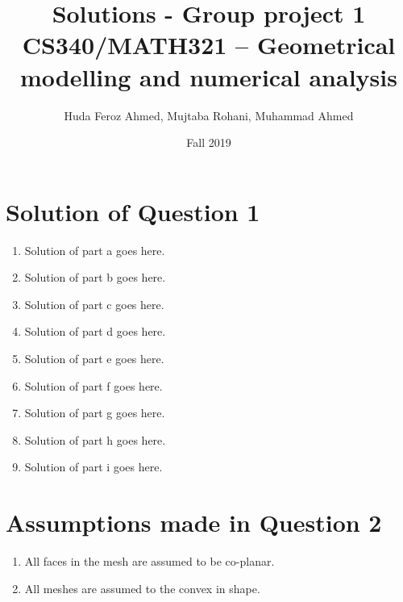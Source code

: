 \documentclass[a4paper, 11pt]{article}
\title{Solutions - Group project 1\\CS340/MATH321 -- Geometrical modelling and numerical analysis}
\date{Fall 2019}
\author{Huda Feroz Ahmed, Mujtaba Rohani, Muhammad Ahmed}
\begin{document}
\maketitle  
\setlength{\parskip}{10pt}
\setlength{\parindent}{0pt}

\section*{Solution of Question 1}
    
\begin{enumerate}[label=\alph*.]
    \item
    Solution of part a goes here.
    
    \item
    Solution of part b goes here.
    
    \item
    Solution of part c goes here.
    
    \item
    Solution of part d goes here.
    
    \item
    Solution of part e goes here.
    
    \item
    Solution of part f goes here.
    
    \item
    Solution of part g goes here.
    
    \item
    Solution of part h goes here.
    
    \item
    Solution of part i goes here.
    
\end{enumerate}

\section*{Assumptions made in Question 2}
    
\begin{enumerate}[label=\alph*.]
    \item
    All faces in the mesh are assumed to be co-planar.
    \item
    All meshes are assumed to the convex in shape.
    
\end{enumerate}
\end{document}
